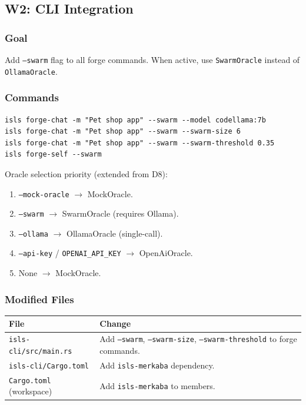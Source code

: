 \documentclass[11pt,a4paper]{article}
\begin{document}
\subsection{W2: CLI Integration}
\label{sec:w2}

\subsubsection{Goal}

Add \texttt{--swarm} flag to all forge commands. When active, 
use \texttt{SwarmOracle} instead of \texttt{OllamaOracle}.

\subsubsection{Commands}

\begin{lstlisting}[style=bash]
isls forge-chat -m "Pet shop app" --swarm --model codellama:7b
isls forge-chat -m "Pet shop app" --swarm --swarm-size 6
isls forge-chat -m "Pet shop app" --swarm --swarm-threshold 0.35
isls forge-self --swarm
\end{lstlisting}

Oracle selection priority (extended from D8):
\begin{enumerate}[nosep]
\item \texttt{--mock-oracle} $\to$ MockOracle.
\item \texttt{--swarm} $\to$ SwarmOracle (requires Ollama).
\item \texttt{--ollama} $\to$ OllamaOracle (single-call).
\item \texttt{--api-key} / \texttt{OPENAI\_API\_KEY} $\to$ OpenAiOracle.
\item None $\to$ MockOracle.
\end{enumerate}

\subsubsection{Modified Files}

\begin{longtable}{lp{10cm}}
\toprule
\textbf{File} & \textbf{Change} \\
\midrule
\texttt{isls-cli/src/main.rs}
  & Add \texttt{--swarm}, \texttt{--swarm-size}, 
    \texttt{--swarm-threshold} to forge commands. \\
\texttt{isls-cli/Cargo.toml}
  & Add \texttt{isls-merkaba} dependency. \\
\texttt{Cargo.toml} (workspace)
  & Add \texttt{isls-merkaba} to members. \\
\bottomrule
\end{longtable}
\end{document}

